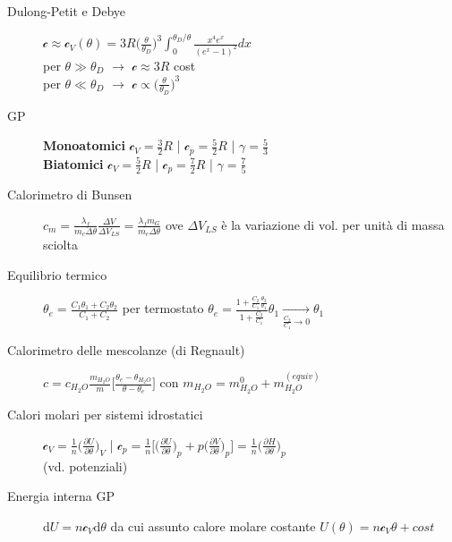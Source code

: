 \documentclass[10pt, oneside]{article}
\begin{document}
\begin{description}
\item[Dulong-Petit e Debye] $\displaystyle \mathcal{c} \approx \mathcal{c}_V(\theta)=3R\big(\frac{\theta}{\theta_D}\big)^3\int_{0}^{\theta_D/\theta}\frac{x^4 e^x}{(e^x-1)^2}dx$ 
\\per $\displaystyle \theta \gg \theta_D$ $\longrightarrow$ $\mathcal{c} \approx 3 R$ cost
\\per $\displaystyle \theta \ll \theta_D$ $\longrightarrow$ $\displaystyle \mathcal{c} \propto \big(\frac{\theta}{\theta_D}\big)^3$
\item[GP]\textbf{Monoatomici} $\displaystyle \mathcal{c}_V = \frac{3}{2}R$ \bigg| $\displaystyle \mathcal{c}_p = \frac{5}{2} R$ \bigg| $\displaystyle \gamma = \frac{5}{3}$
\\\textbf{Biatomici} 
$\displaystyle \mathcal{c}_V = \frac{5}{2}R$ \bigg| $\displaystyle \mathcal{c}_p = \frac{7}{2} R$ \bigg| $\displaystyle \gamma = \frac{7}{5}$
\item[Calorimetro di Bunsen] $\displaystyle c_m = \frac{\lambda_f}{m_c \Delta \theta} \frac{\Delta V}{\Delta V_{LS}} = \frac{\lambda_f m_G}{m_c \Delta \theta}$ ove $\Delta V_{LS}$ è la variazione di vol. per unità di massa sciolta
\item[Equilibrio termico] $\displaystyle \theta_e = \frac{C_1 \theta_1 + C_2 \theta_2}{C_1 + C_2}$ per termostato $\displaystyle \theta_e = \frac{\displaystyle 1 + \frac{C_2}{C_1} \frac{\theta_2}{\theta_1}}{\displaystyle 1 + \frac{C_2}{C_1}} \theta_1 \xrightarrow[\displaystyle \frac{C_2}{C_1} \rightarrow 0]{} \theta_1$
\item[Calorimetro delle mescolanze (di Regnault)] $\displaystyle c = c_{H_2O} \frac{m_{H_2O}}{m}\bigg[\frac{\theta_e - \theta_{H_2O}}{\theta - \theta_e}\bigg]$ con $\displaystyle m_{H_2O} = m_{H_2O}^0 + m_{H_2O}^{(equiv)}$
\item[Calori molari per sistemi idrostatici]
$\displaystyle \mathcal{c}_V = \frac{1}{n} \bigg(\frac{\partial U}{\partial \theta}\bigg)_V$ \hfill \bigg| \hfill $\displaystyle \mathcal{c}_p = \frac{1}{n} \bigg[\bigg(\frac{\partial U}{\partial \theta}\bigg)_p + p \bigg(\frac{\partial V}{\partial \theta}\bigg)_p\bigg] = \frac{1}{n} \bigg(\frac{\partial H}{\partial \theta}\bigg)_p$ \\(vd. potenziali)
\item[Energia interna GP] $\boxed{\displaystyle \mathrm{d}U = n \mathcal{c}_V \mathrm{d}\theta}$ da cui assunto calore molare costante $\displaystyle U(\theta) = n \mathcal{c}_V \theta + cost$
\end{description} 
\end{document}
